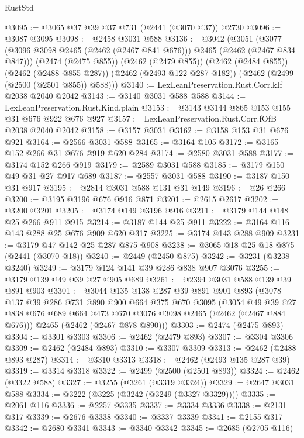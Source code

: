 \begin{lexlean}{RustStd}
\begin{coremodule}
@3095 := @3065 @37 @39 @37 @731 (@2441 (@3070 @37)) @2730
@3096 := @3087 @3095
@3098 := @2458 @3031 @588
@3136 := @3042
    (@3051
      (@3077 (@3096 @3098 @2465 (@2462 (@2467 @841 @676))) @2465 (@2462 (@2467 @834 @847)))
      (@2474 (@2475 @855))
      (@2462 (@2479 @855))
      (@2462 (@2484 @855))
      (@2462 (@2488 @855 @287))
      (@2462 (@2493 @122 @287 @182))
      (@2462 (@2499 (@2500 (@2501 @855)) @588)))
@3140 := LexLeanPreservation.Rust.Corr.kIf @2038 @2040 @2042
@3143 := @3140 @3031 @588 @588
@3144 := LexLeanPreservation.Rust.Kind.plain
@3153 := @3143 @3144 @865 @153 @155 @31 @676 @922 @676 @927
@3157 := LexLeanPreservation.Rust.Corr.fOfB @2038 @2040 @2042
@3158 := @3157 @3031
@3162 := @3158 @153 @31 @676 @921
@3164 := @2566 @3031 @588
@3165 := @3164 @105
@3172 := @3165 @152 @266 @31 @676 @919 @620 @284
@3174 := @2580 @3031 @588
@3177 := @3174 @152 @266 @919
@3179 := @2589 @3031 @588
@3185 := @3179 @150 @49 @31 @27 @917 @689
@3187 := @2557 @3031 @588
@3190 := @3187 @150 @31 @917
@3195 := @2814 @3031 @588 @131 @31 @149
@3196 := @26 @266
@3200 := @3195 @3196 @676 @916 @871
@3201 := @2615 @2617
@3202 := @3200 @3201
@3205 := @3174 @149 @3196 @916
@3211 := @3179 @144 @148 @25 @266 @911 @915
@3214 := @3187 @144 @25 @911
@3222 := @3164 @116 @143 @288 @25 @676 @909 @620 @317
@3225 := @3174 @143 @288 @909
@3231 := @3179 @47 @142 @25 @287 @875 @908
@3238 := @3065 @18 @25 @18 @875 (@2441 (@3070 @18))
@3240 := @2449 (@2450 @875)
@3242 := @3231 (@3238 @3240)
@3249 := @3179 @124 @141 @39 @286 @838 @907 @3076
@3255 := @3179 @139 @49 @39 @27 @905 @689
@3261 := @2394 @3031 @588 @139 @39 @891 @903
@3301 := @3044
    @135
    @138
    @287
    @39
    @891
    @901
    @893
    (@3078
      @137
      @39
      @286
      @731
      @890
      @900
      @664
      @375
      @670
      @3095
      (@3054 @49 @39 @27 @838 @676 @689 @664 @473 @670 @3076 @3098 @2465 (@2462 (@2467 @884 @676)))
      @2465
      (@2462 (@2467 @878 @890)))
@3303 := @2474 (@2475 @893)
@3304 := @3301 @3303
@3306 := @2462 (@2479 @893)
@3307 := @3304 @3306
@3309 := @2462 (@2484 @893)
@3310 := @3307 @3309
@3313 := @2462 (@2488 @893 @287)
@3314 := @3310 @3313
@3318 := @2462 (@2493 @135 @287 @39)
@3319 := @3314 @3318
@3322 := @2499 (@2500 (@2501 @893))
@3324 := @2462 (@3322 @588)
@3327 := @3255 (@3261 (@3319 @3324))
@3329 := @2647 @3031 @588
@3334 := @3222 (@3225 (@3242 (@3249 (@3327 @3329))))
@3335 := @2061 @116
@3336 := @2257 @3335
@3337 := @3334 @3336
@3338 := @2131 @317
@3339 := @2676 @3338
@3340 := @3337 @3339
@3341 := @2155 @317
@3342 := @2680 @3341
@3343 := @3340 @3342
@3345 := @2685 (@2705 @116)

\end{coremodule}
\end{lexlean}
